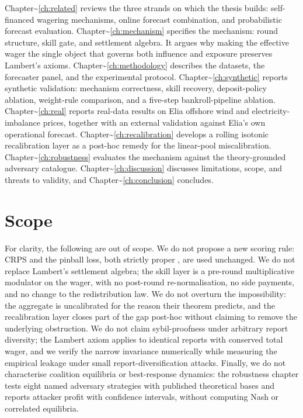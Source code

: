 \documentclass[
  11pt,
  a4paper,
  oneside]{report}
\begin{document}
Chapter\textasciitilde{}\ref{ch:related} reviews the three strands on
which the thesis builds: self-financed wagering mechanisms, online
forecast combination, and probabilistic forecast evaluation.
Chapter\textasciitilde{}\ref{ch:mechanism} specifies the mechanism:
round structure, skill gate, and settlement algebra. It argues why
making the effective wager the single object that governs both influence
and exposure preserves Lambert's axioms.
Chapter\textasciitilde{}\ref{ch:methodology} describes the datasets, the
forecaster panel, and the experimental protocol.
Chapter\textasciitilde{}\ref{ch:synthetic} reports synthetic validation:
mechanism correctness, skill recovery, deposit-policy ablation,
weight-rule comparison, and a five-step bankroll-pipeline ablation.
Chapter\textasciitilde{}\ref{ch:real} reports real-data results on Elia
offshore wind and electricity-imbalance prices, together with an
external validation against Elia's own operational forecast.
Chapter\textasciitilde{}\ref{ch:recalibration} develops a rolling
isotonic recalibration layer as a post-hoc remedy for the
\citet{ranjan2010combining} linear-pool miscalibration.
Chapter\textasciitilde{}\ref{ch:robustness} evaluates the mechanism
against the theory-grounded adversary catalogue.
Chapter\textasciitilde{}\ref{ch:discussion} discusses limitations,
scope, and threats to validity, and
Chapter\textasciitilde{}\ref{ch:conclusion} concludes.

\section{Scope}\label{scope}

For clarity, the following are out of scope. We do not propose a new
scoring rule: CRPS and the pinball loss, both strictly proper
\citep{gneiting2007strictly}, are used unchanged. We do not replace
Lambert's settlement algebra; the skill layer is a pre-round
multiplicative modulator on the wager, with no post-round
re-normalisation, no side payments, and no change to the redistribution
law. We do not overturn the \citet{ranjan2010combining} impossibility:
the aggregate is uncalibrated for the reason their theorem predicts, and
the recalibration layer closes part of the gap post-hoc without claiming
to remove the underlying obstruction. We do not claim sybil-proofness
under arbitrary report diversity; the Lambert axiom applies to identical
reports with conserved total wager, and we verify the narrow invariance
numerically while measuring the empirical leakage under small
report-diversification attacks. Finally, we do not characterise
coalition equilibria or best-response dynamics: the robustness chapter
tests eight named adversary strategies with published theoretical bases
and reports attacker profit with confidence intervals, without computing
Nash or correlated equilibria.
\end{document}
